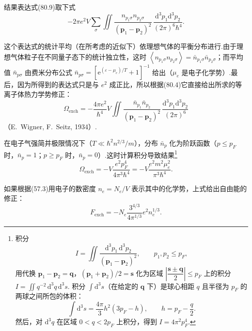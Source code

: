 结果表达式(80.9)取下式
\begin{equation*}
  -2\pi e^2V\sum_{\sigma}\iint
  \frac{n_{p_1\sigma}n_{p_2\sigma}}{(\boldsymbol{p}_1-\boldsymbol{p}_2)^2}
  \,\frac{\mathrm{d}^3p_1\mathrm{d}^3p_2}{(2\pi)^6\hbar^4}.
\end{equation*}

这个表达式的统计平均（在所考虑的近似下）依理想气体的平衡分布进行.由于理想气体粒子在不同量子态下的统计独立性，这时
$\left\langle n_{p_1\sigma}n_{p_2\sigma}\right\rangle
=\bar{n}_{p_1\sigma}\bar{n}_{p_2\sigma}$；而平均值 $\bar{n}_{p\sigma}$
由费米分布公式
$\bar{n}_{p\sigma}=\left[\mathrm{e}^{(\varepsilon-\mu_e)/T}+1\right]^{-1}$
给出（$\mu_e$ 是电子化学势）.最后，因为所得到的表达式只是与 $e^2$ 成正比，所以根据(80.4)它直接给出所求的等离子体热力学势修正：
\begin{equation}
  \Omega_{\mathrm{exch}}=-\frac{4\pi e^2}{\hbar^4}V\iint
  \frac{\bar{n}_{p_1}\bar{n}_{p_2}}{(\boldsymbol{p}_1-\boldsymbol{p}_2)^2}
  \,\frac{\mathrm{d}^3p_1\mathrm{d}^3p_2}{(2\pi)^6}
\end{equation}
（E.~Wigner, F.~Seitz, 1934）.

在电子气强简并极限情况下（$T\ll\hbar^2n^{2/3}/m$），分布 $\bar{n}_p$ 化为阶跃函数（$p\leqslant p_F$ 时，$\bar{n}_p=1$；$p\geqslant p_F$ 时，$\bar{n}_p=0$）.这时计算积分导致结果\footnote{积分
\begin{equation*}
  I=\iint\frac{\mathrm{d}^3p_1\,\mathrm{d}^3p_2}{(\boldsymbol{p}_1-\boldsymbol{p}_2)^2},\qquad p_1,p_2\leqslant p_F,
\end{equation*}
用代换 $\boldsymbol{p}_1-\boldsymbol{p}_2=\boldsymbol{q}$，$(\boldsymbol{p}_1+\boldsymbol{p}_2)/2=\boldsymbol{s}$ 化为区域 $\left|\dfrac{\boldsymbol{s}\pm\boldsymbol{q}}{2}\right|\leqslant p_F$ 上的积分 $I=\iint q^{-2}\,\mathrm{d}^3q\,\mathrm{d}^3s$. 积分 $\int\mathrm{d}^3s$（在给定的 $\boldsymbol{q}$ 下）是球心相距 $q$ 且半径为 $p_F$ 的两球之间所包的体积：
\begin{equation*}
  \int\mathrm{d}^3s=\frac{4\pi}{3}h^2(3p_F-h),\qquad h=p_F-\frac{q}{2}.
\end{equation*}
然后，对 $\mathrm{d}^3q$ 在区域 $0<q<2p_F$ 上积分，得到 $I=4\pi^2p_F^4$.}
\begin{equation}
  \Omega_{\mathrm{exch}}=-V\frac{e^2p_F^4}{4\pi^3\hbar^4}
  =-V\frac{e^2m^2\mu_e^2}{\pi^3\hbar^4}.
\end{equation}

如果根据(57.3)用电子的数密度 $n_e=N_e/V$ 表示其中的化学势，上式给出自由能的修正：
\begin{equation}
  F_{\mathrm{exch}}=-N_e\frac{3^{4/3}}{4\pi^{1/3}}e^2n_e^{1/3}.
\end{equation}

